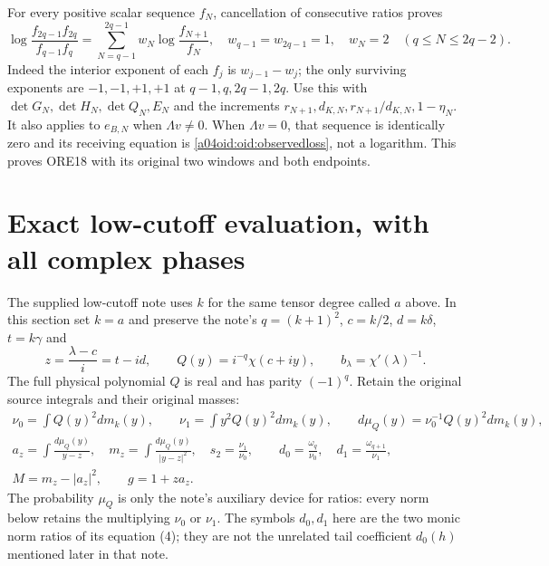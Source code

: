 \documentclass[11pt,a4paper]{article}
\begin{document}
For every positive scalar sequence $f_N$, cancellation of consecutive
ratios proves
\begin{equation}\label{a04oid:oid:windows}
 \log\frac{f_{2q-1}f_{2q}}{f_{q-1}f_q}
 =\sum_{N=q-1}^{2q-1}w_N\log\frac{f_{N+1}}{f_N},\quad
 w_{q-1}=w_{2q-1}=1,\quad w_N=2\quad(q\le N\le2q-2).
\end{equation}
Indeed the interior exponent of each $f_j$ is $w_{j-1}-w_j$;
the only surviving exponents are $-1,-1,+1,+1$ at
$q-1,q,2q-1,2q$. Use this with $\det G_N,\det H_N,\det Q_N,E_N$
and the increments $r_{N+1},d_{K,N},r_{N+1}/d_{K,N},1-\eta_N$.
It also applies to $e_{B,N}$ when $\Lambda v\ne0$. When
$\Lambda v=0$, that sequence is identically zero and its receiving
equation is \eqref{a04oid:oid:observedloss}, not a logarithm. This proves
ORE18 with its original two windows and both endpoints.

\section{Exact low-cutoff evaluation, with all complex phases}

The supplied low-cutoff note uses $k$ for the same tensor degree
called $a$ above. In this section set $k=a$ and preserve the note's
$q=(k+1)^2$, $c=k/2$, $d=k\delta$, $t=k\gamma$ and
\[
 z=\frac{\lambda-c}{i}=t-id,\qquad
 Q(y)=i^{-q}\chi(c+iy),\qquad b_\lambda=\chi'(\lambda)^{-1}.
\]
The full physical polynomial $Q$ is real and has parity $(-1)^q$.
Retain the original source integrals and their original masses:
\begin{equation}\label{a04oid:oid:moments}
\begin{gathered}
 \nu_0=\int Q(y)^2dm_k(y),\qquad
 \nu_1=\int y^2Q(y)^2dm_k(y),\qquad
 d\mu_Q(y)=\nu_0^{-1}Q(y)^2dm_k(y),\\
 a_z=\int\frac{d\mu_Q(y)}{y-z},\quad
 m_z=\int\frac{d\mu_Q(y)}{|y-z|^2},\quad
 s_2=\frac{\nu_1}{\nu_0},\qquad
 d_0=\frac{\omega_q}{\nu_0},\quad
 d_1=\frac{\omega_{q+1}}{\nu_1},\\
 M=m_z-|a_z|^2,\qquad g=1+za_z.
\end{gathered}
\end{equation}
The probability $\mu_Q$ is only the note's auxiliary device for
ratios: every norm below retains the multiplying $\nu_0$ or $\nu_1$.
The symbols $d_0,d_1$ here are the two monic norm ratios of its
equation (4); they are not the unrelated tail coefficient $d_0(h)$
mentioned later in that note.
\end{document}

